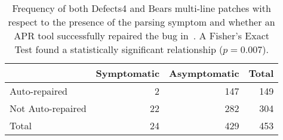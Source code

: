 \begin{table}
{\begin{center}
	\begin{tabular}{l | rr | r}
            	\toprule
            	& Symptomatic & Asymptomatic & Total \\
            	\midrule
            	Auto-repaired & 2 & 147 & 149 \\
            	Not Auto-repaired & 22 & 282 & 304 \\
            	\midrule
            	Total & 24 & 429 & 453\\
            	\bottomrule
	\end{tabular}
 \end{center}
}
	\caption{Frequency of both Defects4 and Bears multi-line patches with respect to the presence of
	the parsing symptom and whether an APR tool successfully
	repaired the bug in~\cite{durieux-repair-them-all}.
	A Fisher's Exact Test found a statistically significant relationship
	($p = 0.007$).}
	\label{tab:parsing-repair-frequencies-both}
\end{table}
